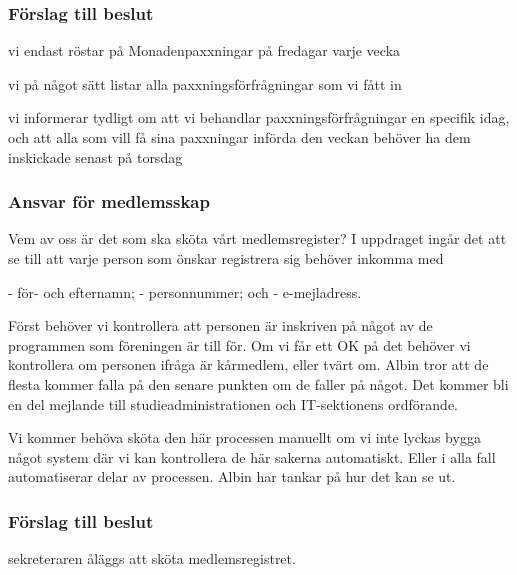\documentclass[protokoll]{dvd}
\begin{document}
\subsubsection*{Förslag till beslut}

\begin{attsatser}
    \item vi endast röstar på Monadenpaxxningar på fredagar varje vecka
    \item vi på något sätt listar alla paxxningsförfrågningar som vi fått in 
    \item vi informerar tydligt om att vi behandlar paxxningsförfrågningar en specifik idag, och att alla som vill få sina paxxningar införda den veckan behöver ha dem inskickade senast på torsdag
\end{attsatser}










\subsubsection{Ansvar för medlemsskap}

Vem av oss är det som ska sköta vårt medlemsregister? I uppdraget ingår det att se till att varje person som önskar registrera sig behöver inkomma med

- för- och efternamn;
- personnummer; och
- e-mejladress.

Först behöver vi kontrollera att personen är inskriven på något av de programmen som föreningen är till för. Om vi får ett OK på det behöver vi kontrollera om personen ifråga är kårmedlem, eller tvärt om. Albin tror att de flesta kommer falla på den senare punkten om de faller på något. Det kommer bli en del mejlande till studieadministrationen och IT-sektionens ordförande.

Vi kommer behöva sköta den här processen manuellt om vi inte lyckas bygga något system där vi kan kontrollera de här sakerna automatiskt. Eller i alla fall automatiserar delar av processen. Albin har tankar på hur det kan se ut.


\subsubsection*{Förslag till beslut}

\begin{attsatser}
    \item sekreteraren åläggs att sköta medlemsregistret.
\end{attsatser}
\end{document}
